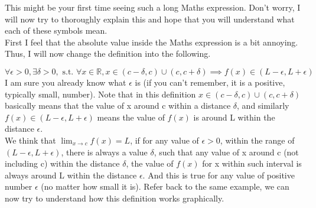 \documentclass{book}
\begin{document}
This might be your first time seeing such a long Maths expression. Don't worry, I will now try to thoroughly explain this and hope that you will understand what each of these symbols mean. \\

First I feel that the absolute value inside the Maths expression is a bit annoying. Thus, I will now change the definition into the following.

$$\forall \epsilon > 0, \exists \delta > 0, \text{ s.t. } \forall x \in \mathbb{R}, x \in (c - \delta, c) \cup (c, c + \delta) \implies f(x) \in (L - \epsilon, L + \epsilon)$$
I am sure you already know what $\epsilon$ is (if you can't remember, it is a positive, typically small, number). Note that in this definition $x \in (c - \delta, c) \cup (c, c + \delta)$ basically means that the value of x around c within a distance $\delta$, and similarly $f(x) \in (L - \epsilon, L + \epsilon)$ means the value of $f(x)$ is around L within the distance $\epsilon$. \\

We think that $\lim_{x \rightarrow c} f(x) = L$, if for any value of $\epsilon > 0$, within the range of $(L - \epsilon, L + \epsilon)$, there is always a value $\delta$, such that any value of x around c (not including c) within the distance $\delta$, the value of $f(x)$ for x within such interval is always around L within the distance $\epsilon$. And this is true for any value of positive number $\epsilon$ (no matter how small it is). Refer back to the same example, we can now try to understand how this definition works graphically.

\begin{center}
\end{center}
\end{document}
